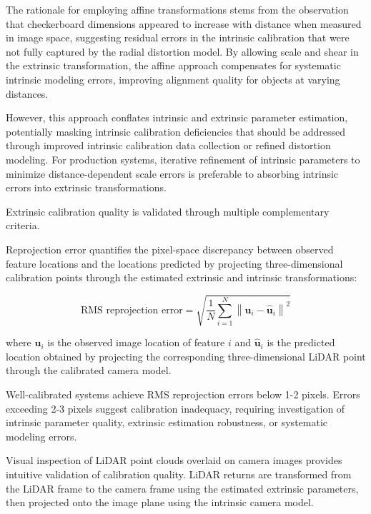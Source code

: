The rationale for employing affine transformations stems from the observation that checkerboard dimensions appeared to increase with distance when measured in image space, suggesting residual errors in the intrinsic calibration that were not fully captured by the radial distortion model.
By allowing scale and shear in the extrinsic transformation, the affine approach compensates for systematic intrinsic modeling errors, improving alignment quality for objects at varying distances.

However, this approach conflates intrinsic and extrinsic parameter estimation, potentially masking intrinsic calibration deficiencies that should be addressed through improved intrinsic calibration data collection or refined distortion modeling.
For production systems, iterative refinement of intrinsic parameters to minimize distance-dependent scale errors is preferable to absorbing intrinsic errors into extrinsic transformations.


Extrinsic calibration quality is validated through multiple complementary criteria.


Reprojection error quantifies the pixel-space discrepancy between observed feature locations and the locations predicted by projecting three-dimensional calibration points through the estimated extrinsic and intrinsic transformations:

\begin{equation}
    \text{RMS reprojection error} = \sqrt{\frac{1}{N}\sum_{i=1}^{N} \left\| \mathbf{u}_i - \hat{\mathbf{u}}_i \right\|^2} 
\end{equation}

where $\mathbf{u}_i$ is the observed image location of feature $i$ and $\hat{\mathbf{u}}_i$ is the predicted location obtained by projecting the corresponding three-dimensional LiDAR point through the calibrated camera model.

Well-calibrated systems achieve RMS reprojection errors below 1-2 pixels.
Errors exceeding 2-3 pixels suggest calibration inadequacy, requiring investigation of intrinsic parameter quality, extrinsic estimation robustness, or systematic modeling errors.


Visual inspection of LiDAR point clouds overlaid on camera images provides intuitive validation of calibration quality.
LiDAR returns are transformed from the LiDAR frame to the camera frame using the estimated extrinsic parameters, then projected onto the image plane using the intrinsic camera model.

